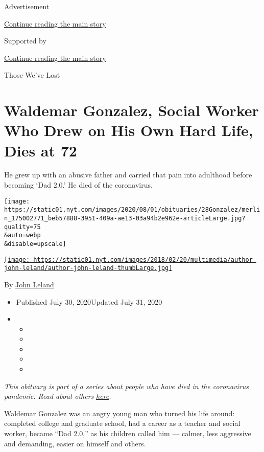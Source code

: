 Advertisement

\protect\hyperlink{after-top}{Continue reading the main story}

Supported by

\protect\hyperlink{after-sponsor}{Continue reading the main story}

Those We've Lost

\hypertarget{waldemar-gonzalez-social-worker-who-drew-on-his-own-hard-life-dies-at-72}{%
\section{Waldemar Gonzalez, Social Worker Who Drew on His Own Hard Life,
Dies at
72}\label{waldemar-gonzalez-social-worker-who-drew-on-his-own-hard-life-dies-at-72}}

He grew up with an abusive father and carried that pain into adulthood
before becoming `Dad 2.0.' He died of the coronavirus.

\texttt{[image: https://static01.nyt.com/images/2020/08/01/obituaries/28Gonzalez/merlin\_175002771\_beb57888-3951-409a-ae13-03a94b2e962e-articleLarge.jpg?quality=75\\\&auto=webp\\\&disable=upscale]}

\href{https://www.nytimes.com/by/john-leland}{\texttt{[image: https://static01.nyt.com/images/2018/02/20/multimedia/author-john-leland/author-john-leland-thumbLarge.jpg]}}

By \href{https://www.nytimes.com/by/john-leland}{John Leland}

\begin{itemize}
\item
  Published July 30, 2020Updated July 31, 2020
\item
  \begin{itemize}
  \item
  \item
  \item
  \item
  \item
  \end{itemize}
\end{itemize}

\emph{This obituary is part of a series about people who have died in
the coronavirus pandemic. Read about others}
\href{https://www.nytimes.com/interactive/2020/obituaries/people-died-coronavirus-obituaries.html}{\emph{here}}\emph{.}

Waldemar Gonzalez was an angry young man who turned his life around:
completed college and graduate school, had a career as a teacher and
social worker, became ``Dad 2.0,'' as his children called him ---
calmer, less aggressive and demanding, easier on himself and others.

